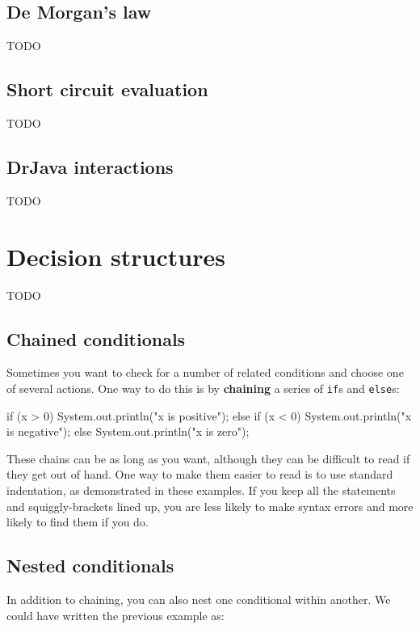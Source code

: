 \subsection{De Morgan's law}
TODO

\subsection{Short circuit evaluation}
TODO

\subsection{DrJava interactions}
TODO


\section{Decision structures}
TODO

\subsection{Chained conditionals}


Sometimes you want to check for a number of related conditions and choose one of several actions.
One way to do this is by {\bf chaining} a series of {\tt if}s and {\tt else}s:

\begin{code}
    if (x > 0) {
        System.out.println("x is positive");
    } else if (x < 0) {
        System.out.println("x is negative");
    } else {
        System.out.println("x is zero");
    }
\end{code}

These chains can be as long as you want, although they can be difficult to read if they get out of hand.
One way to make them easier to read is to use standard indentation, as demonstrated in these examples.
If you keep all the statements and squiggly-brackets lined up, you are less likely to make syntax errors and more likely to find them if you do.

\subsection{Nested conditionals}


In addition to chaining, you can also nest one conditional within another.
We could have written the previous example as:

